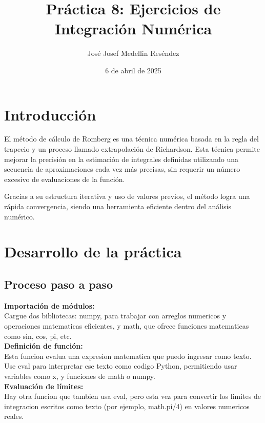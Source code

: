 \documentclass[12pt]{article}
\title{Práctica 8: Ejercicios de Integración Numérica}
\author{José Josef Medellin Reséndez}
\date{6 de abril de 2025}
\begin{document}
\maketitle

\section*{ Introducción}

El método de cálculo de Romberg es una técnica numérica basada en la regla del trapecio y un proceso llamado extrapolación de Richardson. Esta técnica permite mejorar la precisión en la estimación de integrales definidas utilizando una secuencia de aproximaciones cada vez más precisas, sin requerir un número excesivo de evaluaciones de la función.

Gracias a su estructura iterativa y uso de valores previos, el método logra una rápida convergencia, siendo una herramienta eficiente dentro del análisis numérico.

\section*{ Desarrollo de la práctica}

\subsection*{ Proceso paso a paso}

\textbf{Importación de módulos:}\\
Cargue dos bibliotecas: numpy, para trabajar con arreglos numericos y operaciones matematicas eficientes, y math, que ofrece funciones matematicas como
sin, cos, pi, etc.\\

\textbf{Definición de función:}\\
Esta funcion evalua una expresion matematica que puedo ingresar como texto.
Use eval para interpretar ese texto como codigo Python, permitiendo usar variables como x, y funciones de math o numpy.
\\

\textbf{Evaluación de límites:}\\
Hay otra funcion que tambien usa eval, pero esta vez para convertir los limites
de integracion escritos como texto (por ejemplo, math.pi/4) en valores numericos
reales.\\
\end{document}
